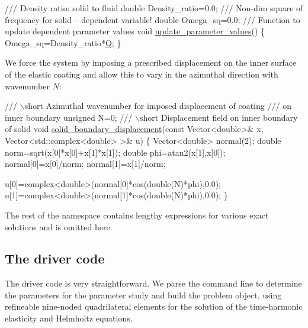 \begin{DoxyCodeInclude}
  \textcolor{comment}{}
\textcolor{comment}{ /// Density ratio: solid to fluid}
\textcolor{comment}{} \textcolor{keywordtype}{double} Density\_ratio=0.0;
\textcolor{comment}{}
\textcolor{comment}{ /// Non-dim square of frequency for solid -- dependent variable!}
\textcolor{comment}{} \textcolor{keywordtype}{double} Omega\_sq=0.0;
\textcolor{comment}{}
\textcolor{comment}{ /// Function to update dependent parameter values}
\textcolor{comment}{} \textcolor{keywordtype}{void} \hyperlink{namespaceGlobal__Parameters_ae0f9a80fb7510dbfbbef22582da231b7}{update\_parameter\_values}()
 \{
  Omega\_sq=Density\_ratio*\hyperlink{namespaceGlobal__Parameters_a7814fddf663e56168174a42d2cd6b4c1}{Q};
 \}

\end{DoxyCodeInclude}


We force the system by imposing a prescribed displacement on the inner surface of the elastic coating and allow this to vary in the azimuthal direction with wavenumber $ N $\+:


\begin{DoxyCodeInclude}
\textcolor{comment}{}
\textcolor{comment}{ /// \(\backslash\)short Azimuthal wavenumber for imposed displacement of coating}
\textcolor{comment}{ /// on inner boundary }
\textcolor{comment}{} \textcolor{keywordtype}{unsigned} N=0; 
\textcolor{comment}{}
\textcolor{comment}{ /// \(\backslash\)short Displacement field on inner boundary of solid}
\textcolor{comment}{} \textcolor{keywordtype}{void} \hyperlink{namespaceGlobal__Parameters_ab51fa55d06d9963d363bcf966cfcc62b}{solid\_boundary\_displacement}(\textcolor{keyword}{const} Vector<double>& x,
                                  Vector<std::complex<double> >& u)
 \{
  Vector<double> normal(2);
  \textcolor{keywordtype}{double} norm=sqrt(x[0]*x[0]+x[1]*x[1]);
  \textcolor{keywordtype}{double} phi=atan2(x[1],x[0]);
  normal[0]=x[0]/norm;
  normal[1]=x[1]/norm;

  u[0]=complex<double>(normal[0]*cos(\textcolor{keywordtype}{double}(N)*phi),0.0);
  u[1]=complex<double>(normal[1]*cos(\textcolor{keywordtype}{double}(N)*phi),0.0);
 \}

\end{DoxyCodeInclude}


The rest of the namespace contains lengthy expressions for various exact solutions and is omitted here.



 

\hypertarget{index_main}{}\subsection{The driver code}\label{index_main}
The driver code is very straightforward. We parse the command line to determine the parameters for the parameter study and build the problem object, using refineable nine-\/noded quadrilateral elements for the solution of the time-\/harmonic elasticity and Helmholtz equations.

